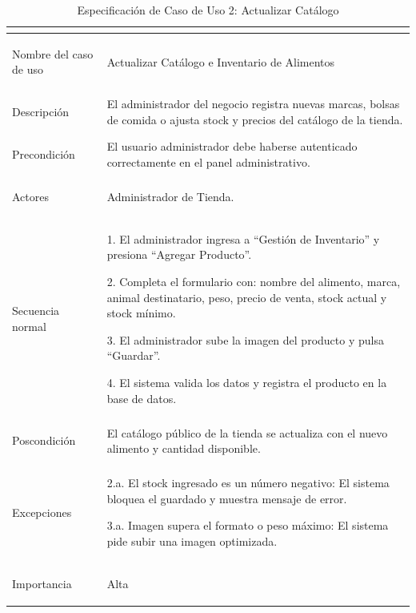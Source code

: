 \documentclass[11pt,a4paper]{article}
\begin{document}
\newpage
\begin{table}[H]
    \centering
    \small
    \renewcommand{\arraystretch}{1.4}
    \begin{tabularx}{\textwidth}{|>{\bfseries\raggedright\arraybackslash}p{4cm}|L|}
        \hline
          \\
        \hline
        Nombre del caso de uso & Actualizar Catálogo e Inventario de Alimentos \\
        \hline
        Descripción & El administrador del negocio registra nuevas marcas, bolsas de comida o ajusta stock y precios del catálogo de la tienda. \\
        \hline
        Precondición & El usuario administrador debe haberse autenticado correctamente en el panel administrativo. \\
        \hline
        Actores & Administrador de Tienda. \\
        \hline
        Secuencia normal & 
        1. El administrador ingresa a ``Gestión de Inventario'' y presiona ``Agregar Producto''. \par
        2. Completa el formulario con: nombre del alimento, marca, animal destinatario, peso, precio de venta, stock actual y stock mínimo. \par
        3. El administrador sube la imagen del producto y pulsa ``Guardar''. \par
        4. El sistema valida los datos y registra el producto en la base de datos. \\
        \hline
        Poscondición & El catálogo público de la tienda se actualiza con el nuevo alimento y cantidad disponible. \\
        \hline
        Excepciones & 
        2.a. El stock ingresado es un número negativo: El sistema bloquea el guardado y muestra mensaje de error. \par
        3.a. Imagen supera el formato o peso máximo: El sistema pide subir una imagen optimizada. \\
        \hline
        Importancia & Alta \\
        \hline
    \end{tabularx}
    \caption{Especificación de Caso de Uso 2: Actualizar Catálogo}
    \label{tab:especificacion_cu2}
\end{table}
\end{document}
